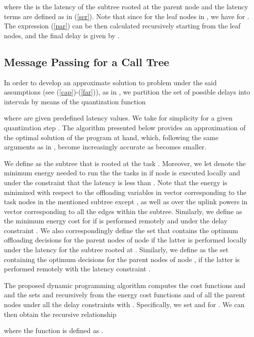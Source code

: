 \documentclass[journal,twocolumn,10pt,twoside]{IEEEtranTCOM}
\theoremstyle{plain}
\theoremstyle{plain}
\theoremstyle{remark}
\begin{document}
where the  is the latency of the subtree rooted at the parent node  and the latency terms are defined as in (\ref{ser}). Note that since  for the leaf nodes in , we have  for . The expression (\ref{par}) can be then calculated recursively starting from the leaf nodes, and the final delay is given by . \subsection{Message Passing for a Call Tree}
\label{sec:par:tree}
In order to develop an approximate solution to problem  under the said assumptions (see (\ref{cap})-(\ref{far})), as in \cite{no}, we partition the set of possible delays into  intervals by means of the quantization function

where  are given predefined latency values. We take for simplicity  for a given quantization step . The algorithm presented below provides  an approximation of the optimal solution of the program at hand, which, following the same arguments as in \cite{no}\cite{hermp}, become increasingly accurate as  becomes smaller.

We define  as the subtree  that is rooted at the task . Moreover, we let  denote the minimum energy needed to run the the tasks in   if node  is executed locally and under the constraint that the latency is less than . Note that the energy  is minimized with respect to the offloading variables in vector  corresponding to the task nodes in the mentioned subtree except , as well as over the uplink powers in vector  corresponding to all the edges within the subtree. Similarly, we define   as the minimum energy cost for  if  is performed remotely and under the delay constraint . We also correspondingly define the set  that  contains the optimum offloading decisions for the parent nodes   of node  if the latter is performed locally under the latency  for the subtree rooted at . Similarly, we define  as the set containing the optimum decisions for the parent nodes  of node , if the latter is performed remotely with the latency constraint .

The proposed dynamic programming algorithm computes the cost functions  and   and the sets  and  recursively from the energy cost functions  and  of all the parent nodes  under all the delay constraints  with . Specifically, we set  and   for  . We can then obtain the recursive relationship

where the function  is defined as .
\end{document}
